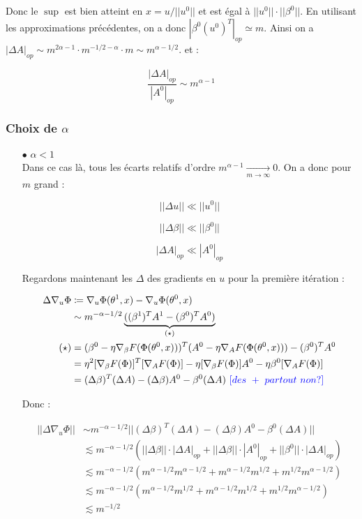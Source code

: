 \documentclass[a4paper, 11pt, french]{article}
\newcommand{\ch}[1]{{\color{blue} [ #1 ]}}
\begin{document}
	Donc le $\sup$ est bien atteint en $x = u / ||u^0||$ et est égal à $||u^0|| \cdot ||\beta^0||$. En utilisant les approximations précédentes, on a donc $|\beta^0 (u^0)^T|_{op} \simeq m$. Ainsi on a $|\Delta A|_{op} \sim m^{2\alpha - 1} \cdot m^{-1/2 - \alpha} \cdot m \sim m^{\alpha - 1/2}.$ et :
	
	\[\frac{|\Delta A|_{op}}{|A^0|_{op}} \sim m^{\alpha - 1}\]
	
	\subsubsection{Choix de $\alpha$}
	
	\begin{itemize}
		\item[$\bullet$] $\alpha < 1$ \\
		
		Dans ce cas là, tous les écarts relatifs d'ordre $m^{\alpha - 1} \xrightarrow[m \to \infty]{} 0$. On a donc pour $m$ grand :
		
		\[||\Delta u|| \ll ||u^0||\]
		
		\[||\Delta \beta|| \ll ||\beta^0||\]
		
		\[|\Delta A|_{op} \ll |A^0|_{op}\]

		Regardons maintenant les $\Delta$ des gradients en $u$ pour la première itération :
		
		\begin{align}
			\Delta \nabla_u \Phi &\coloneqq \nabla_u \Phi (\theta^1, x) -  \nabla_u \Phi (\theta^0, x) \\
			&\sim m^{-\alpha - 1/2} \underbrace{((\beta^1)^T A^1 - (\beta^0)^T A^0)}_\text{($\star$)} \\
			 (\star) &= (\beta^0 - \eta \nabla_{\beta} F(\Phi(\theta^0, x)))^T (A^0 - \eta \nabla_{A} F(\Phi(\theta^0, x))) - (\beta^0)^T A^0 \\
			&= \eta^2 [\nabla_{\beta} F(\Phi)]^T[\nabla_{A} F(\Phi)] - \eta [\nabla_{\beta} F(\Phi)] A^0 - \eta \beta^0 [\nabla_{A} F(\Phi)] \\
			&= (\Delta \beta)^T(\Delta A) - (\Delta \beta) A^0 -  \beta^0 (\Delta A)\ \ch{des \ +\ partout\ non?}
		\end{align}
	
	Donc :
	
	\begin{align}
		||\Delta \nabla_u \Phi|| &\sim m^{-\alpha - 1/2} ||(\Delta \beta)^T(\Delta A) - (\Delta \beta) A^0 -  \beta^0 (\Delta A)|| \\
		&\lesssim m^{-\alpha - 1/2} (||\Delta \beta|| \cdot |\Delta A|_{op} + ||\Delta \beta|| \cdot |A^0|_{op} + ||\beta^0|| \cdot |\Delta A|_{op}) \\
		&\lesssim m^{-\alpha - 1/2} (m^{\alpha - 1/2}m^{\alpha - 1/2} + m^{\alpha - 1/2}m^{1/2} + m^{1/2}m^{\alpha - 1/2}) \\
		&\lesssim m^{-\alpha - 1/2} (m^{\alpha - 1/2}m^{1/2} + m^{\alpha - 1/2}m^{1/2} + m^{1/2}m^{\alpha - 1/2}) \\
		&\lesssim m^{-1/2}
	\end{align}


\end{itemize}
\end{document}
